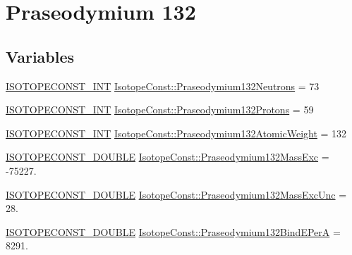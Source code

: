 \hypertarget{group___isotope_const-_praseodymium-_pr132}{}\section{Praseodymium 132}
\label{group___isotope_const-_praseodymium-_pr132}
\subsection*{Variables}
\begin{DoxyCompactItemize}
\item 
\mbox{\hyperlink{group___isotope_const-_macros_ga5f18360b3e99483a35c32d789e62621c}{I\+S\+O\+T\+O\+P\+E\+C\+O\+N\+S\+T\+\_\+\+I\+NT}} \mbox{\hyperlink{group___isotope_const-_praseodymium-_pr132_ga9f960a946981383da2f470d60a4946a3}{Isotope\+Const\+::\+Praseodymium132\+Neutrons}} = 73
\item 
\mbox{\hyperlink{group___isotope_const-_macros_ga5f18360b3e99483a35c32d789e62621c}{I\+S\+O\+T\+O\+P\+E\+C\+O\+N\+S\+T\+\_\+\+I\+NT}} \mbox{\hyperlink{group___isotope_const-_praseodymium-_pr132_ga3e54706965218790e93fed09842a1bfa}{Isotope\+Const\+::\+Praseodymium132\+Protons}} = 59
\item 
\mbox{\hyperlink{group___isotope_const-_macros_ga5f18360b3e99483a35c32d789e62621c}{I\+S\+O\+T\+O\+P\+E\+C\+O\+N\+S\+T\+\_\+\+I\+NT}} \mbox{\hyperlink{group___isotope_const-_praseodymium-_pr132_ga6a6237195c2ad53d164ba20e9800cb66}{Isotope\+Const\+::\+Praseodymium132\+Atomic\+Weight}} = 132
\item 
\mbox{\hyperlink{group___isotope_const-_macros_ga8f45a7272ce02c0b4c65c44636ed719a}{I\+S\+O\+T\+O\+P\+E\+C\+O\+N\+S\+T\+\_\+\+D\+O\+U\+B\+LE}} \mbox{\hyperlink{group___isotope_const-_praseodymium-_pr132_gad09ed6695ef26ba9746aaaa3d2ab09c4}{Isotope\+Const\+::\+Praseodymium132\+Mass\+Exc}} = -\/75227.
\item 
\mbox{\hyperlink{group___isotope_const-_macros_ga8f45a7272ce02c0b4c65c44636ed719a}{I\+S\+O\+T\+O\+P\+E\+C\+O\+N\+S\+T\+\_\+\+D\+O\+U\+B\+LE}} \mbox{\hyperlink{group___isotope_const-_praseodymium-_pr132_ga1a7a25d942519614cb7281a80106e254}{Isotope\+Const\+::\+Praseodymium132\+Mass\+Exc\+Unc}} = 28.
\item 
\mbox{\hyperlink{group___isotope_const-_macros_ga8f45a7272ce02c0b4c65c44636ed719a}{I\+S\+O\+T\+O\+P\+E\+C\+O\+N\+S\+T\+\_\+\+D\+O\+U\+B\+LE}} \mbox{\hyperlink{group___isotope_const-_praseodymium-_pr132_ga0ee9591f3836da47b277c041db754aed}{Isotope\+Const\+::\+Praseodymium132\+Bind\+E\+PerA}} = 8291.

\end{DoxyCompactItemize}
